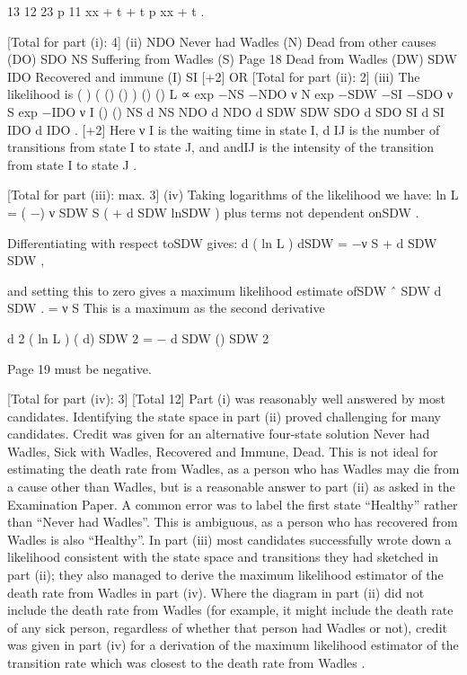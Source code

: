 \documentclass[a4paper,12pt]{article}
\begin{document}
13
12 23
p 11
x\mu x + t + t p x\mu x + t .

[Total for part (i): 4]
(ii)
\mu NDO
Never had
Wadles
(N)
Dead from
other causes
(DO)
\mu SDO
\mu NS
Suffering from
Wadles
(S)
Page 18
Dead from
Wadles (DW)
\mu SDW
\mu IDO
Recovered
and immune
(I)
\mu SI
[+2]
OR
[Total for part (ii): 2]
(iii)
The likelihood is
{ (
) } { (
(\mu ) (\mu )
) } {
(\mu ) (\mu )
L ∝ exp −\mu NS −\mu NDO ν N exp −\mu SDW −\mu SI −\mu SDO ν S exp −\mu IDO ν I
(\mu ) (\mu )
NS
d NS
NDO
d NDO
d SDW
SDW
SDO
d SDO
SI
d SI
IDO
d IDO
}
.
[+2]
Here
ν I is the waiting time in state I, 
d IJ is the number of transitions from state I to state J, and 
and\mu IJ is the intensity of the transition from state I to state J .

[Total for part (iii): max. 3]
(iv)
Taking logarithms of the likelihood we have:
ln L =
( −\mu ) ν
SDW
S
(
+ d SDW ln\mu SDW
)
plus terms not dependent on\mu SDW .

Differentiating with respect to\mu SDW gives:
d ( ln L )
d\mu SDW
= −ν S +
d SDW
\mu SDW
,

and setting this to zero gives a maximum likelihood estimate of\mu SDW
\mu ˆ
SDW
d SDW
.
=
ν S
This is a maximum as the second derivative


d 2 ( ln L )
( d\mu )
SDW
2
= −
d SDW
(\mu )
SDW
2

Page 19
must be negative.

[Total for part (iv): 3]
[Total 12]
Part (i) was reasonably well answered by most candidates. Identifying
the state space in part (ii) proved challenging for many candidates.
Credit was given for an alternative four-state solution {Never had
Wadles, Sick with Wadles, Recovered and Immune, Dead}. This is not
ideal for estimating the death rate from Wadles, as a person who has
Wadles may die from a cause other than Wadles, but is a reasonable
answer to part (ii) as asked in the Examination Paper. A common
error was to label the first state “Healthy” rather than “Never had
Wadles”. This is ambiguous, as a person who has recovered from
Wadles is also “Healthy”. In part (iii) most candidates successfully
wrote down a likelihood consistent with the state space and transitions
they had sketched in part (ii); they also managed to derive the
maximum likelihood estimator of the death rate from Wadles in part
(iv). Where the diagram in part (ii) did not include the death rate from
Wadles (for example, it might include the death rate of any sick person,
regardless of whether that person had Wadles or not), credit was given
in part (iv) for a derivation of the maximum likelihood estimator of the
transition rate which was closest to the death rate from Wadles .
\end{document}
